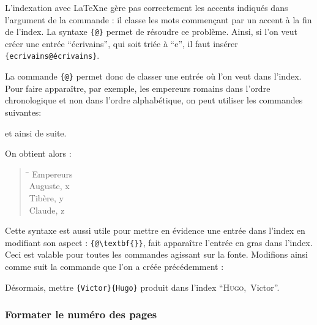 L'indexation avec \LaTeX ne gère pas correctement les accents indiqués dans l'argument de la commande  : il classe les mots commençant par un accent à la fin de l'index. La syntaxe \verb|{|\verb|@|\verb+}+ permet de résoudre ce problème. Ainsi, si l'on veut créer une entrée \enquote{écrivains}, qui soit triée à \enquote{e}, il faut insérer \verb|{ecrivains@écrivains}|.

La commande \verb|{|\verb|@|\verb+}+ permet donc de classer une entrée où l'on veut dans l'index. Pour faire apparaître, par exemple, les empereurs romains dans l'ordre chronologique et non dans l'ordre alphabétique, on peut utiliser les commandes suivantes:

\begin{latexcode}
et ainsi de suite. 
\end{latexcode}

On obtient alors :

\begin{quotation}
\begin{tabbing}
\hspace{0,5cm} \= \kill
Empereurs\\
\> Auguste, x\\
\> Tibère, y\\
\> Claude, z 
\end{tabbing}
\end{quotation}

Cette syntaxe est aussi utile pour mettre en évidence une entrée dans l'index en modifiant son aspect : \verb|{|\verb|@\textbf{|\verb|}}|, fait apparaître l'entrée en gras dans l'index. Ceci est valable pour toutes les commandes agissant sur la fonte. Modifions ainsi comme suit la commande  que l'on a créée précédemment :


Désormais, mettre \verb|{Victor}{Hugo}| produit  dans l'index
 \enquote{\textsc{Hugo},~Victor}.
 
 

\subsubsection{Formater le numéro des pages}

